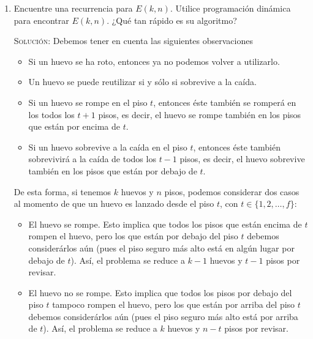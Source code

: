 \documentclass[letterpaper,11pt]{article}
\begin{document}
\begin{enumerate}
\begin{enumerate}
        \item Encuentre una recurrencia para $E(k,n)$. Utilice programación 
        dinámica para encontrar $E(k,n)$. ¿Qué tan rápido es su algoritmo?

        \textsc{Solución:} Debemos tener en cuenta las siguientes 
        observaciones 
        \begin{itemize}
            \item Si un huevo se ha roto, entonces ya no podemos volver a 
            utilizarlo.

            \item Un huevo se puede reutilizar si y sólo si sobrevive a 
            la caída. 

            \item Si un huevo se rompe en el piso $t$, entonces éste también 
            se romperá en los todos los $t+1$ pisos, es decir, el huevo se 
            rompe también en los pisos que están por encima de $t$.

            \item Si un huevo sobrevive a la caída en el piso $t$, entonces 
            éste también sobrevivirá a la caída de todos los $t-1$ pisos, 
            es decir, el huevo sobrevive también en los pisos que están por 
            debajo de $t$. 
        \end{itemize}

        De esta forma, si tenemos $k$ huevos y $n$ pisos, podemos considerar 
        dos casos al momento de que un huevo es lanzado desde el piso $t$, 
        con $t \in \{1, 2, \ldots, f\}$:
        \begin{itemize}
            \item El huevo se rompe. Esto implica que todos los pisos que están
            encima de $t$ rompen el huevo, pero los que están por debajo del 
            piso $t$ debemos considerárlos aún (pues el piso seguro más alto 
            está en algún lugar por debajo de $t$). Así, el problema se reduce 
            a $k-1$ huevos y $t-1$ pisos por revisar.

            \item El huevo no se rompe. Esto implica que todos los pisos 
            por debajo del piso $t$ tampoco rompen el huevo, pero los que están 
            por arriba del piso $t$ debemos considerárlos aún (pues el piso 
            seguro más alto está por arriba de $t$). Así, el problema se  
            reduce a $k$ huevos y $n-t$ pisos por revisar. 
        \end{itemize}


\end{enumerate}
\end{enumerate}
\end{document}

